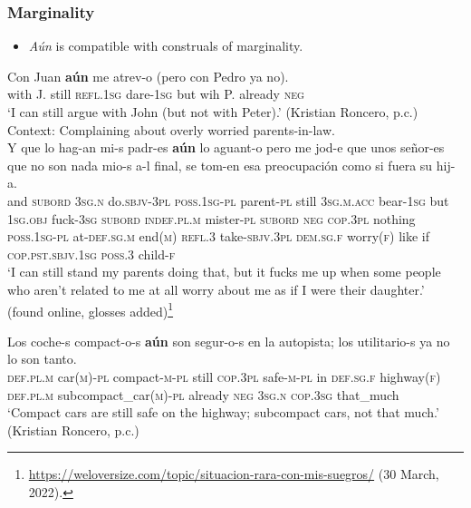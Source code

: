 \subsubsection{Marginality}
\label{appendixSpanishAunMarginal}
\begin{itemize}
	\item \textit{Aún} is compatible with construals of marginality. 
\end{itemize}
\begin{exe}

	\ex\label{exAppendixSpanishAunMarginal1}
	\gll Con Juan \textbf{aún} me atrev-o (pero con Pedro ya no).\\
	with J. still \textsc{refl}.1\textsc{sg} dare-1\textsc{sg} \phantom{(}but wih P. already \textsc{neg}\\
	\glt \lq I can still argue with John (but not with Peter).' (Kristian Roncero, p.c.)
	\largerpage[-1]\pagebreak
	\ex\label{exAppendixSpanishAunMarginal2}
	Context: Complaining about overly worried parents-in-law.\\
\gll Y que lo hag-an mi-s padr-es \textbf{aún} lo aguant-o pero me jod-e que unos señor-es que no son nada mio-s a-l final, se tom-en esa preocupación como si fuera su hij-a.\\
and \textsc{subord} 3\textsc{sg}.\textsc{n} do.\textsc{sbjv}-3\textsc{pl} \textsc{poss}.1\textsc{sg}-\textsc{pl} parent-\textsc{pl} still 3\textsc{sg}.\textsc{m}.\textsc{acc} bear-1\textsc{sg} but 1\textsc{sg}.\textsc{obj} fuck-3\textsc{sg} \textsc{subord} \textsc{indef}.\textsc{pl}.\textsc{m} mister-\textsc{pl} \textsc{subord} \textsc{neg} \textsc{cop}.3\textsc{pl} nothing \textsc{poss}.1\textsc{sg}-\textsc{pl} at-\textsc{def}.\textsc{sg}.\textsc{m} end(\textsc{m}) \textsc{refl}.3 take-\textsc{sbjv}.3\textsc{pl} \textsc{dem}.\textsc{sg}.\textsc{f} worry(\textsc{f}) like if \textsc{cop}.\textsc{pst}.\textsc{sbjv}.1\textsc{sg} \textsc{poss}.3 child-\textsc{f}\\
\glt \lq I can still stand my parents doing that, but it fucks me up when some people who aren't related to me at all worry about me as if I were their daughter.' (found online, glosses added)\footnote{\url{https://weloversize.com/topic/situacion-rara-con-mis-suegros/} (30 March, 2022).}

	\ex\label{exAppendixSpanishAunMarginal3}
	\gll Los coche-s compact-o-s \textbf{aún} son segur-o-s en la autopista; los utilitario-s ya no lo son tanto.\\
	\textsc{def}.\textsc{pl}.\textsc{m} car(\textsc{m})-\textsc{pl} compact-\textsc{m}-\textsc{pl} still \textsc{cop}.3\textsc{pl} safe-\textsc{m}-\textsc{pl} in \textsc{def}.\textsc{sg}.\textsc{f} highway(\textsc{f}) \textsc{def}.\textsc{pl}.\textsc{m} subcompact\_car(\textsc{m})-\textsc{pl} already \textsc{neg} 3\textsc{sg}.\textsc{n} \textsc{cop}.3\textsc{sg} that\_much\\
	\glt \lq Compact cars are still safe on the highway; subcompact cars, not that much.' (Kristian Roncero, p.c.)


\end{exe}
